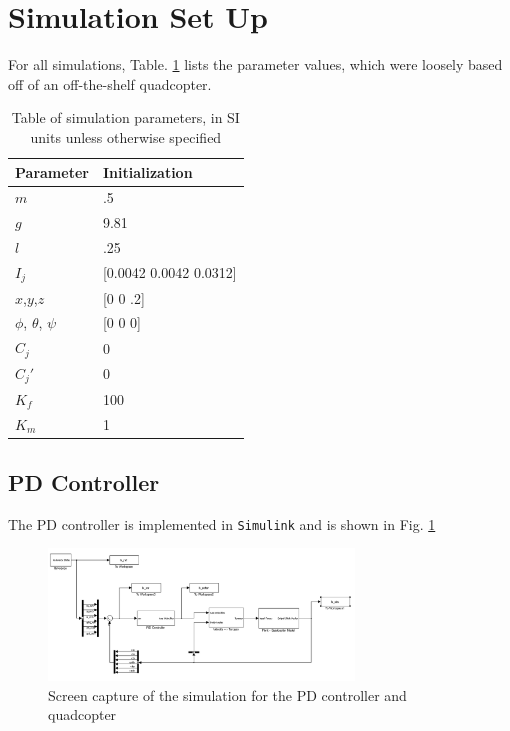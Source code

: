 \documentclass[conference]{IEEEtran}
\begin{document}
\section{Simulation Set Up} \label{simulation}
For all simulations, Table. \ref{tbl:sim_params} lists the parameter values, which were loosely based off of an off-the-shelf quadcopter.
\begin{table}
\centering
\begin{tabular}{|l|l|}
\hline
\textbf{Parameter} & \textbf{Initialization}                    \\ \hline
$m$             & .5                        \\ \hline
$g$             & 9.81 \\ \hline
$l$             & .25 \\ \hline
$I_j$           & [0.0042 0.0042 0.0312] \\ \hline
$x$,$y$,$z$     & [0 0 .2] \\ \hline
$\phi$, $\theta$, $\psi$ & [0 0 0] \\ \hline
$C_j$           & 0 \\ \hline
$C_j'$          & 0  \\ \hline
$K_f$           & 100  \\ \hline
$K_m$           & 1  \\ \hline
\end{tabular}
\caption{Table of simulation parameters, in SI units unless otherwise specified}
\label{tbl:sim_params}
\end{table}

\subsection{PD Controller}
The PD controller is implemented in \verb|Simulink| and is shown in Fig. \ref{fig:pd_mdl}
\begin{figure}[!ht]
\centering
\includegraphics[width=3.2in]{images/pd_mdl.png}
\caption{Screen capture of the simulation for the PD controller and quadcopter}
\label{fig:pd_mdl}
\end{figure}
\end{document}
